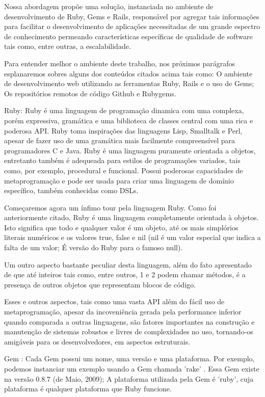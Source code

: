 Nossa abordagem propõe uma solução, instanciada no ambiente de desenvolvimento de Ruby, Gems e Rails, responsável por agregar tais informações para facilitar o desenvolvimento de aplicações necessitadas de um grande espectro de conhecimento permeando características específicas de qualidade de software tais como, entre outras, a escalabilidade.

Para entender melhor o ambiente deste trabalho, nos próximos parágrafos esplanaremos sobres alguns dos conteúdos citados acima tais como: O ambiente de desenvolvimento web utilizando as ferramentas Ruby, Rails e o uso de Gems; Os repositórios remotos de código Github e Rubygems. \cite{flanagan2008ruby}

Ruby: Ruby é uma linguagem de programação dinamica com uma complexa, porém expressiva, gramática e uma biblioteca de classes central com uma rica e poderosa API. Ruby toma inspirações das linguagens Lisp, Smalltalk e Perl, apesar de fazer uso de uma gramática mais facilmente compreensível para programadores C e Java. Ruby é uma linguagem puramente orientada a objetos, entretanto também é adequeada para estilos de programações variados, tais como, por exemplo, procedural e funcional. Possui poderosas capacidades de metaprogramação e pode ser usada para criar uma linguagem de domínio específico, também conhecidas como DSLs.

Começaremos agora um ínfimo tour pela linguagem Ruby. Como foi anteriormente citado, Ruby é uma linguagem completamente orientada à objetos. Isto significa que todo e qualquer valor é um objeto, até os mais simplórios literais numéricos e os valores true, false e nil (nil é um valor especial que indica a falta de um valor; É versão do Ruby para o famoso null).

Um outro aspecto bastante peculiar desta linguagem, além do fato apresentado de que até inteiros tais como, entre outros, 1 e 2 podem chamar métodos, é a presença de outros objetos que representam blocos de código.

Esses e outros aspectos, tais como uma vasta API além do fácil uso de metaprogramação, apesar da incoveniência gerada pela performance inferior quando comparada a outras linguagens, são fatores importantes na construção e manutenção de sistemas robustos e livres de complexidades no uso, tornando-os amigáveis para os desenvolvedores, em aspectos estruturais.

Gem \cite{berube2007practical}: Cada Gem possui um nome, uma versão e uma plataforma. Por exemplo, podemos instanciar um exemplo usando a Gem chamada 'rake' \cite{rake2014}. Essa Gem existe na versão 0.8.7 (de Maio, 2009); A plataforma utilizada pela Gem é 'ruby', cuja plataforma é qualquer plataforma que Ruby funcione. 

